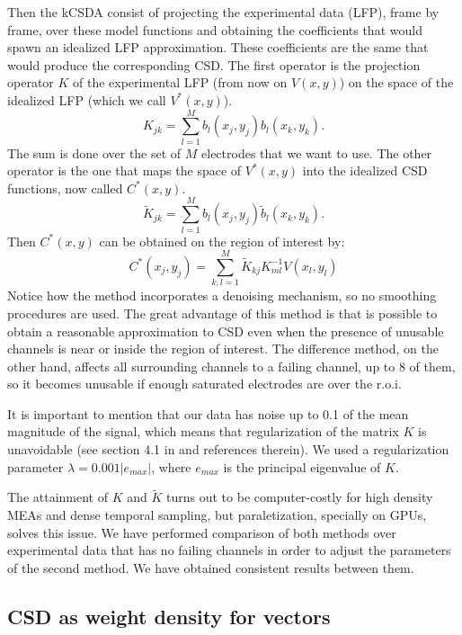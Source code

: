 \documentclass{article}
\begin{document}
Then the kCSDA consist of projecting the experimental data (LFP), frame by frame,
over these model functions and obtaining the  coefficients that would spawn an idealized
LFP approximation. These coefficients are the same that would produce the
corresponding CSD. The first operator is the projection operator $K$ of the experimental
LFP (from now on $V(x,y)$) on the space of the idealized LFP (which we call $V^* (x,y)$).
\begin{equation}
  K_{jk}=\sum_{l=1}^{M}b_l(x_j,y_j)b_l(x_k,y_k).
\end{equation}
The sum is done over the set of $M$ electrodes that we want to use.
The other operator is the one that maps the space of $V^*(x,y)$ into the idealized
CSD functions, now called $C^*(x,y)$. 
\begin{equation}
  \tilde{K}_{jk}=\sum_{l=1}^Mb_l(x_j,y_j)\tilde{b}_l(x_k,y_k).
\end{equation}
Then $C^*(x,y)$ can be obtained on the region of interest by:
\begin{equation}
  C^*(x_j,y_j)=\sum_{k,l=1}^M \tilde{K}_{kj} K^{-1}_{ml} V(x_l,y_l)
\end{equation}
Notice how the method incorporates a denoising mechanism, so
no smoothing procedures are used.
The great advantage of this method is that is possible to obtain a reasonable
approximation to CSD even when the presence of unusable channels is near or inside
the region of interest. The difference method, on the other hand, affects all surrounding
channels to a failing channel, up to 8 of them, so it becomes unusable if enough
saturated electrodes are over the r.o.i.

It is important to mention that our data has noise up to 0.1 of the mean magnitude of the
signal, which means that regularization of the matrix $K$ is unavoidable (see section 4.1 in \cite{Potworowski2011} and references therein). We used a regularization parameter $\lambda=0.001 |e_{max}|$, where $e_{max}$ is the principal eigenvalue of $K$. 

The attainment of $K$ and $\tilde{K}$ turns out to be computer-costly for high density MEAs and dense temporal sampling, but paraletization, specially on
GPUs, solves this issue.
We have performed comparison of both methods over experimental data that has
no failing channels in order to adjust the parameters of the second method. We
have obtained consistent results between them.


\subsection{CSD as weight density for vectors}
\end{document}

